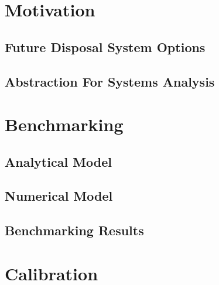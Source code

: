 

\section{Motivation}
\subsection{Future Disposal System Options}



\subsection{Abstraction For Systems Analysis}


\section{Benchmarking}
\subsection{Analytical Model}

\subsection{Numerical Model}

\subsection{Benchmarking Results}


\section{Calibration}




